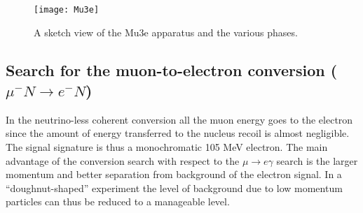 \documentclass[12pt,a4paper,openright, oneside, titlepage]{book} %
\begin{document}
\begin{figure}[h!]
\centering
\texttt{[image: Mu3e]}
\caption{A sketch view of the Mu3e apparatus \cite{Mu3e:2013} and the various phases.}
\label{_Mu3e}
\end{figure}



\subsection{Search for the muon-to-electron conversion ($\mu^-N \rightarrow e^-N$)}
\label{muNeN}
In the neutrino-less coherent conversion all the muon energy goes to the electron since the amount of energy
transferred to the nucleus recoil is almost negligible. The signal signature is thus a monochromatic 105 MeV electron.
The main advantage of the conversion search with respect to the $\mu\rightarrow e\gamma$ search is the
larger momentum and better separation from background of the electron signal.
In a ``doughnut-shaped'' experiment the level of background due to low momentum particles
can thus be reduced to a manageable level.
\end{document}
